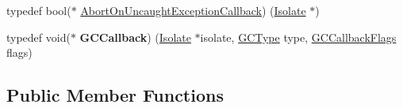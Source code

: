 \begin{DoxyCompactItemize}
\item 
typedef bool($\ast$ \hyperlink{classv8_1_1Isolate_aeb1d49e500d9521b42743a6a740271e2}{Abort\+On\+Uncaught\+Exception\+Callback}) (\hyperlink{classv8_1_1Isolate}{Isolate} $\ast$)
\item 
typedef void($\ast$ {\bfseries G\+C\+Callback}) (\hyperlink{classv8_1_1Isolate}{Isolate} $\ast$isolate, \hyperlink{namespacev8_ac109d6f27e0c0f9ef4e98bcf7a806cf2}{G\+C\+Type} type, \hyperlink{namespacev8_a247c37a849f4d6c293b9b16e94e1944b}{G\+C\+Callback\+Flags} flags)\hypertarget{classv8_1_1Isolate_aba82364e6057ee6df3fb896a7e972750}{}\label{classv8_1_1Isolate_aba82364e6057ee6df3fb896a7e972750}

\end{DoxyCompactItemize}
\subsection*{Public Member Functions}
